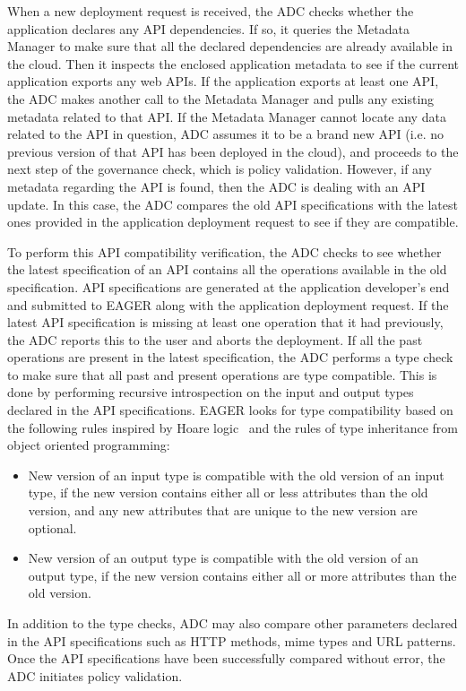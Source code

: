 When a new deployment request is received, the ADC checks whether the
application declares any API dependencies. If so, it queries the Metadata
Manager to make sure that all the declared dependencies are already available
in the cloud.  Then it inspects the enclosed application metadata to see if
the current application exports any web APIs. If the application exports at
least one API, the ADC makes another call to the Metadata Manager and pulls
any existing metadata related to that API. If the Metadata Manager cannot
locate any data related to the API in question, ADC assumes it to be a brand
new API (i.e. no previous version of that API has been deployed in the cloud),
and proceeds to the next step of the governance check, which is policy
validation. However, if any metadata regarding the API is found, then the ADC
is dealing with an API update. In this case, the ADC compares the old API
specifications with the latest ones provided in the application deployment
request to see if they are compatible.

To perform this API compatibility verification, the ADC checks to see whether
the latest specification of an API contains all the operations available in
the old specification. API specifications are generated at the application developer's
end and submitted to EAGER along with the application deployment request.
If the latest API specification is missing at least one
operation that it had previously, the ADC reports this to the user and aborts
the deployment. If all the past operations are present in the latest
specification, the ADC performs a type check to make sure that all past and
present operations are type compatible. This is done by performing recursive
introspection on the input and output types declared in the API
specifications. EAGER looks for type compatibility based on the following
rules inspired by Hoare logic~\cite{Hoare:1969:ABC:363235.363259} and the
rules of type inheritance from object oriented programming:
\begin{itemize}
\vspace{0.1in}
\item New version of an input type is compatible with the old version of an input type, if the new version contains either all or less attributes than the 
old version, and any new attributes that are unique to the new version are optional.
\vspace{0.1in}
\item New version of an output type is compatible with the old version of an output type, if the new version contains either all or more attributes than the 
old version.
\vspace{0.1in}
\end{itemize}
In addition to the type checks, ADC may also compare other parameters declared in the API specifications
such as HTTP methods, mime types and URL patterns.
Once the API specifications have been successfully compared without error,
the ADC initiates policy validation. 

